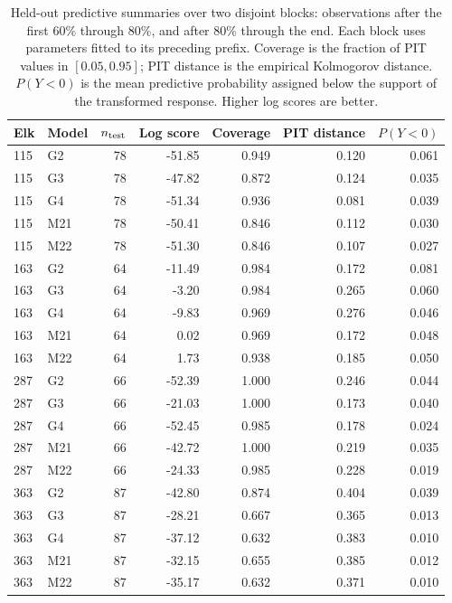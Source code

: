 \begin{table}[tbp]
\centering\small
\caption{Held-out predictive summaries over two disjoint blocks: observations after the first 60\% through 80\%, and after 80\% through the end. Each block uses parameters fitted to its preceding prefix. Coverage is the fraction of PIT values in $[0.05,0.95]$; PIT distance is the empirical Kolmogorov distance. $P(Y<0)$ is the mean predictive probability assigned below the support of the transformed response. Higher log scores are better.}\label{tab:si-predictions}
\begin{tabular}{llrrrrr}\toprule
Elk & Model & $n_{\rm test}$ & Log score & Coverage & PIT distance & $P(Y<0)$ \\\midrule
115 & G2 & 78 & -51.85 & 0.949 & 0.120 & 0.061 \\
115 & G3 & 78 & -47.82 & 0.872 & 0.124 & 0.035 \\
115 & G4 & 78 & -51.34 & 0.936 & 0.081 & 0.039 \\
115 & M21 & 78 & -50.41 & 0.846 & 0.112 & 0.030 \\
115 & M22 & 78 & -51.30 & 0.846 & 0.107 & 0.027 \\
163 & G2 & 64 & -11.49 & 0.984 & 0.172 & 0.081 \\
163 & G3 & 64 & -3.20 & 0.984 & 0.265 & 0.060 \\
163 & G4 & 64 & -9.83 & 0.969 & 0.276 & 0.046 \\
163 & M21 & 64 & 0.02 & 0.969 & 0.172 & 0.048 \\
163 & M22 & 64 & 1.73 & 0.938 & 0.185 & 0.050 \\
287 & G2 & 66 & -52.39 & 1.000 & 0.246 & 0.044 \\
287 & G3 & 66 & -21.03 & 1.000 & 0.173 & 0.040 \\
287 & G4 & 66 & -52.45 & 0.985 & 0.178 & 0.024 \\
287 & M21 & 66 & -42.72 & 1.000 & 0.219 & 0.035 \\
287 & M22 & 66 & -24.33 & 0.985 & 0.228 & 0.019 \\
363 & G2 & 87 & -42.80 & 0.874 & 0.404 & 0.039 \\
363 & G3 & 87 & -28.21 & 0.667 & 0.365 & 0.013 \\
363 & G4 & 87 & -37.12 & 0.632 & 0.383 & 0.010 \\
363 & M21 & 87 & -32.15 & 0.655 & 0.385 & 0.012 \\
363 & M22 & 87 & -35.17 & 0.632 & 0.371 & 0.010 \\
\bottomrule\end{tabular}
\end{table}
